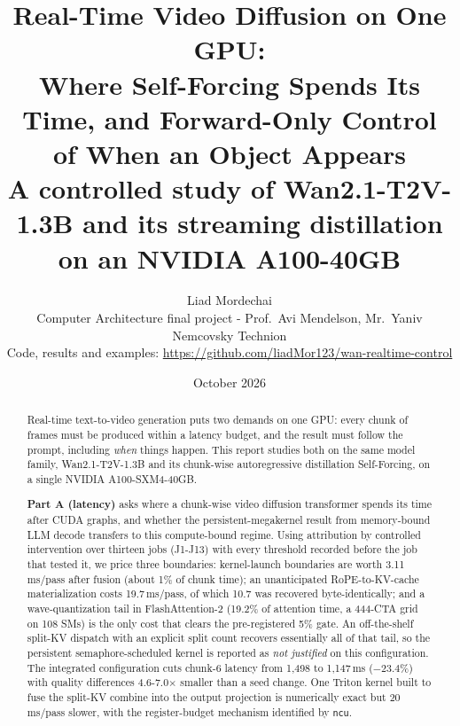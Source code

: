 \documentclass[10pt,a4paper]{article}
\title{\textbf{Real-Time Video Diffusion on One GPU:}\\[3pt]
\textbf{Where Self-Forcing Spends Its Time, and Forward-Only Control of When an Object Appears}\\[6pt]
\large A controlled study of Wan2.1-T2V-1.3B and its streaming distillation on an NVIDIA A100-40GB}
\author{Liad Mordechai\\
\small Computer Architecture final project - Prof.\ Avi Mendelson, Mr.\ Yaniv Nemcovsky \textperiodcentered{} Technion\\
\small Code, results and examples: \url{https://github.com/liadMor123/wan-realtime-control}}
\date{October 2026}
\begin{document}
\maketitle

\begin{abstract}
Real-time text-to-video generation puts two demands on one GPU: every chunk of frames must be produced within a latency budget, and the result must follow the prompt, including \emph{when} things happen. This report studies both on the same model family, Wan2.1-T2V-1.3B and its chunk-wise autoregressive distillation Self-Forcing, on a single NVIDIA A100-SXM4-40GB.

\textbf{Part A (latency)} asks where a chunk-wise video diffusion transformer spends its time after CUDA graphs, and whether the persistent-megakernel result from memory-bound LLM decode transfers to this compute-bound regime. Using attribution by controlled intervention over thirteen jobs (J1-J13) with every threshold recorded before the job that tested it, we price three boundaries: kernel-launch boundaries are worth 3.11\,ms/pass after fusion (about 1\% of chunk time); an unanticipated RoPE-to-KV-cache materialization costs 19.7\,ms/pass, of which 10.7 was recovered byte-identically; and a wave-quantization tail in FlashAttention-2 (19.2\% of attention time, a 444-CTA grid on 108 SMs) is the only cost that clears the pre-registered 5\% gate. An off-the-shelf split-KV dispatch with an explicit split count recovers essentially all of that tail, so the persistent semaphore-scheduled kernel is reported as \emph{not justified} on this configuration. The integrated configuration cuts chunk-6 latency from 1{,}498 to 1{,}147\,ms ($-23.4\%$) with quality differences 4.6-7.0$\times$ smaller than a seed change. One Triton kernel built to fuse the split-KV combine into the output projection is numerically exact but 20\,ms/pass slower, with the register-budget mechanism identified by \texttt{ncu}.


\end{abstract}
\end{document}
